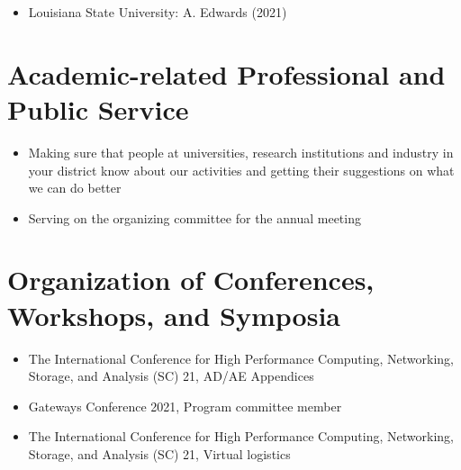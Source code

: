 \documentclass[11pt,a4paper,sans]{moderncv}
\begin{document}
\begin{itemize}[leftmargin=4cm]
\item Louisiana State University: A. Edwards (2021)
\end{itemize}


\section{Academic-related Professional and Public Service}

\begin{itemize}[leftmargin=4cm]
\item Making sure that people at universities, research institutions and industry in your district know
  about our activities and getting their suggestions on what we can do better
\item Serving on the organizing committee for the annual meeting
\end{itemize}

\section{Organization of Conferences, Workshops, and Symposia}
\begin{itemize}[leftmargin=4cm]
\item The International Conference for High Performance Computing, Networking, Storage, and Analysis (SC) 21, AD/AE Appendices
\item Gateways Conference 2021, Program committee member
\item The International Conference for High Performance Computing, Networking, Storage, and Analysis (SC) 21, Virtual logistics
\end{itemize}
\end{document}
